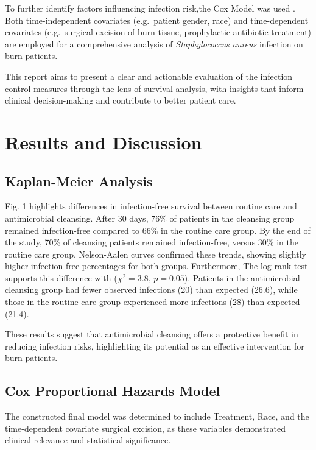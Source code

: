 \documentclass[12pt]{article}
\begin{document}
To further identify factors influencing infection risk,the Cox Model was
used \citep{cox1972}. Both time-independent covariates (e.g.~patient
gender, race) and time-dependent covariates (e.g.~surgical excision of
burn tissue, prophylactic antibiotic treatment) are employed for a
comprehensive analysis of \emph{Staphylococcus aureus} infection on burn
patients.

This report aims to present a clear and actionable evaluation of the
infection control measures through the lens of survival analysis, with
insights that inform clinical decision-making and contribute to better
patient care.

\section{Results and Discussion}\label{results-and-discussion}

\subsection{Kaplan-Meier Analysis}\label{kaplan-meier-analysis}

Fig. 1 highlights differences in infection-free survival between routine
care and antimicrobial cleansing. After 30 days, 76\% of patients in the
cleansing group remained infection-free compared to 66\% in the routine
care group. By the end of the study, 70\% of cleansing patients remained
infection-free, versus 30\% in the routine care group. Nelson-Aalen
curves confirmed these trends, showing slightly higher infection-free
percentages for both groups. Furthermore, The log-rank test supports
this difference with (\(\chi^2 = 3.8\), \(p = 0.05\)). Patients in the
antimicrobial cleansing group had fewer observed infections (20) than
expected (26.6), while those in the routine care group experienced more
infections (28) than expected (21.4).

These results suggest that antimicrobial cleansing offers a protective
benefit in reducing infection risks, highlighting its potential as an
effective intervention for burn patients.

\subsection{Cox Proportional Hazards
Model}\label{cox-proportional-hazards-model}

The constructed final model was determined to include Treatment, Race,
and the time-dependent covariate surgical excision, as these variables
demonstrated clinical relevance and statistical significance.
\end{document}
